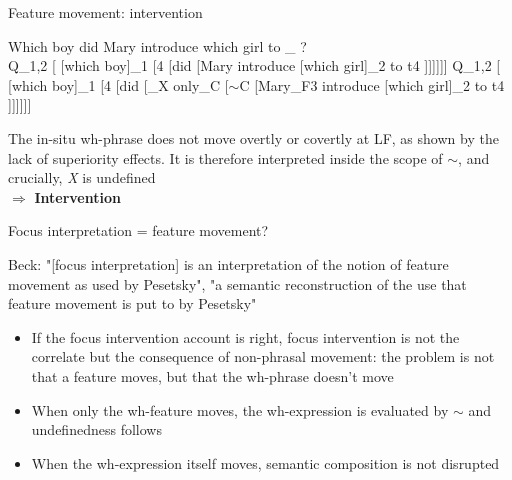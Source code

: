 \documentclass[11pt,final,hyperref={pdfpagelabels=false}]{beamer}
\begin{document}
\begin{frame}{Feature movement: intervention}

	\begin{exe}
		\ex Which boy did Mary introduce which girl to \_ ?\\
		{\footnotesize{Q_{1,2} [ [which boy]_{1} [4 [did [Mary introduce [which girl]_{2} to t4 ]]]]]]}}
		{\scriptsize{Q_{1,2} [ [which boy]_{1} [4 [did [_{X} only_{C} [$\sim$C [Mary_{F3} introduce [which girl]_{2} to t4 ]]]]]]}}
	\end{exe}

The in-situ wh-phrase does not move overtly or covertly at LF, as shown by the lack of superiority effects. It is therefore interpreted inside the scope of $\sim$, and crucially, \textit{X} is undefined\\ $\Rightarrow$ \textbf{Intervention}
\end{frame}

\begin{frame}{Focus interpretation = feature movement?}

Beck: "[focus interpretation] is an interpretation of the notion of feature movement as used by Pesetsky", "a semantic reconstruction of the use that feature movement is put to by Pesetsky"

\begin{itemize}
\item If the focus intervention account is right, focus intervention is not the correlate but the consequence of non-phrasal movement: the problem is not that a feature moves, but that the wh-phrase doesn't move
\item When only the wh-feature moves, the wh-expression is evaluated by $\sim$ and undefinedness follows
\item When the wh-expression itself moves, semantic composition is not disrupted
\end{itemize}


\end{frame}
\end{document}
